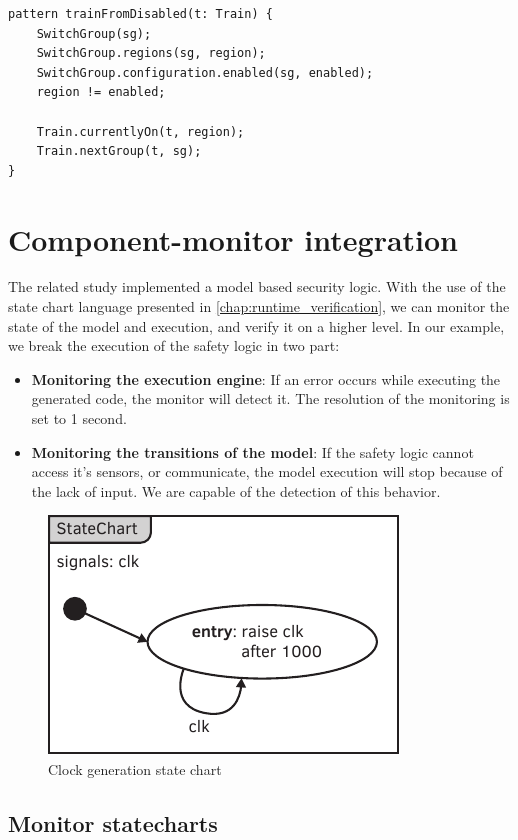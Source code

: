 \begin{lstlisting}[caption={Collision detection},label=lst:case_study:train_at_next_powerable]
pattern trainFromDisabled(t: Train) {
	SwitchGroup(sg);
	SwitchGroup.regions(sg, region);
	SwitchGroup.configuration.enabled(sg, enabled);
	region != enabled;
	
	Train.currentlyOn(t, region);
	Train.nextGroup(t, sg);
}
\end{lstlisting}

\section{Component-monitor integration}

The related study \citep{tdk2014} implemented a model based security logic. With the use of the state chart language presented in \vref{chap:runtime_verification}, we can monitor the state of the model and execution, and verify it on a higher level. In our example, we break the execution of the safety logic in two part:
\begin{itemize}
	\item \textbf{Monitoring the execution engine}: If an error occurs while executing the generated code, the monitor will detect it. The resolution of the monitoring is set to 1 second.
	\item \textbf{Monitoring the transitions of the model}: If the safety logic cannot access it's sensors, or communicate, the model execution will stop because of the lack of input. We are capable of the detection of this behavior.
\end{itemize}

\begin{figure}[h]
	\centering
	\includegraphics[width=0.3\linewidth]{include/figures/chapter_6/statecharts/clock}
	\caption{Clock generation state chart}
	\label{fig:case_study:clockgen}
\end{figure}

\subsection{Monitor statecharts}
\label{sec:case_study:mon_sc}

